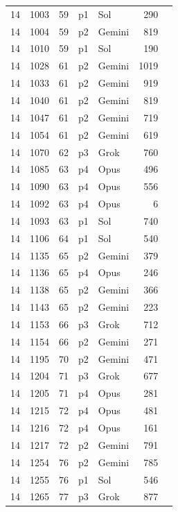 \begin{longtable}{r r r l l r L{2.2in}}
14 & 1003 & 59 & p1 & Sol & 290 &  \\
14 & 1004 & 59 & p2 & Gemini & 819 &  \\
14 & 1010 & 59 & p1 & Sol & 190 &  \\
14 & 1028 & 61 & p2 & Gemini & 1019 &  \\
14 & 1033 & 61 & p2 & Gemini & 919 &  \\
14 & 1040 & 61 & p2 & Gemini & 819 &  \\
14 & 1047 & 61 & p2 & Gemini & 719 &  \\
14 & 1054 & 61 & p2 & Gemini & 619 &  \\
14 & 1070 & 62 & p3 & Grok & 760 &  \\
14 & 1085 & 63 & p4 & Opus & 496 &  \\
14 & 1090 & 63 & p4 & Opus & 556 &  \\
14 & 1092 & 63 & p4 & Opus & 6 &  \\
14 & 1093 & 63 & p1 & Sol & 740 &  \\
14 & 1106 & 64 & p1 & Sol & 540 &  \\
14 & 1135 & 65 & p2 & Gemini & 379 &  \\
14 & 1136 & 65 & p4 & Opus & 246 &  \\
14 & 1138 & 65 & p2 & Gemini & 366 &  \\
14 & 1143 & 65 & p2 & Gemini & 223 &  \\
14 & 1153 & 66 & p3 & Grok & 712 &  \\
14 & 1154 & 66 & p2 & Gemini & 271 &  \\
14 & 1195 & 70 & p2 & Gemini & 471 &  \\
14 & 1204 & 71 & p3 & Grok & 677 &  \\
14 & 1205 & 71 & p4 & Opus & 281 &  \\
14 & 1215 & 72 & p4 & Opus & 481 &  \\
14 & 1216 & 72 & p4 & Opus & 161 &  \\
14 & 1217 & 72 & p2 & Gemini & 791 &  \\
14 & 1254 & 76 & p2 & Gemini & 785 &  \\
14 & 1255 & 76 & p1 & Sol & 546 &  \\
14 & 1265 & 77 & p3 & Grok & 877 &  \\

\end{longtable}
